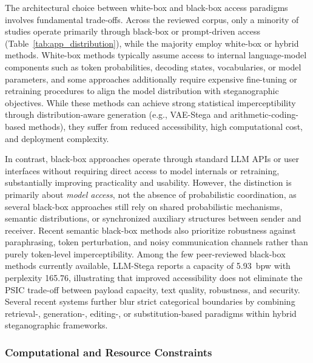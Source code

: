 The architectural choice between white-box and black-box access paradigms involves fundamental trade-offs. Across the reviewed corpus, only a minority of studies operate primarily through black-box or prompt-driven access (Table~\ref{tab:app_distribution}), while the majority employ white-box or hybrid methods. White-box methods typically assume access to internal language-model components such as token probabilities, decoding states, vocabularies, or model parameters, and some approaches additionally require expensive fine-tuning or retraining procedures to align the model distribution with steganographic objectives. While these methods can achieve strong statistical imperceptibility through distribution-aware generation (e.g., VAE-Stega and arithmetic-coding-based methods), they suffer from reduced accessibility, high computational cost, and deployment complexity.

In contrast, black-box approaches operate through standard LLM APIs or user interfaces without requiring direct access to model internals or retraining, substantially improving practicality and usability. However, the distinction is primarily about \emph{model access}, not the absence of probabilistic coordination, as several black-box approaches still rely on shared probabilistic mechanisms, semantic distributions, or synchronized auxiliary structures between sender and receiver. Recent semantic black-box methods also prioritize robustness against paraphrasing, token perturbation, and noisy communication channels rather than purely token-level imperceptibility. Among the few peer-reviewed black-box methods currently available, LLM-Stega reports a capacity of 5.93~bpw with perplexity 165.76, illustrating that improved accessibility does not eliminate the PSIC trade-off between payload capacity, text quality, robustness, and security. Several recent systems further blur strict categorical boundaries by combining retrieval-, generation-, editing-, or substitution-based paradigms within hybrid steganographic frameworks.

\subsubsection{Computational and Resource Constraints}

